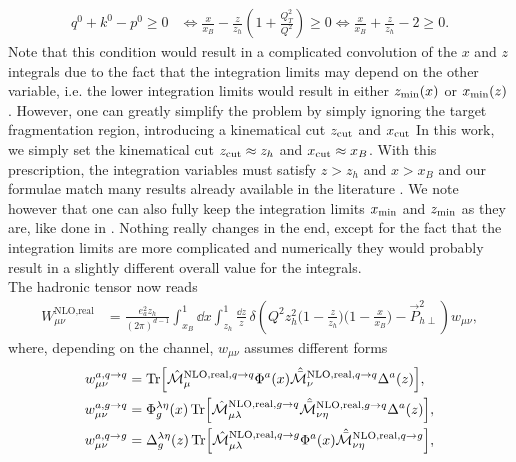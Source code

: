 \begin{equation}\label{eq:NLOrealtw2_theta function condition}
    \begin{aligned}
        q^0+k^0-p^0\ge 0 & \iff \frac{x}{x_B}-\frac{z}{z_h}\left(1+\frac{Q_T^2}{Q^2}\right)\ge 0 \iff \frac{x}{x_B}+\frac{z}{z_h}-2\ge 0.
    \end{aligned}
\end{equation}
Note that this condition would result in a complicated convolution of the $x$ and $z$ integrals due to the fact that the integration limits may depend on the other variable, i.e. the lower integration limits would result in either $z_{\rm min}(x)$ or $x_{\rm min}(z)$. However, one can greatly simplify the problem by simply ignoring the target fragmentation region, introducing a kinematical cut $z_{\rm cut}$ and $x_{\rm cut}$ \cite{Sissakian_2004} In this work, we simply set the kinematical cut $z_{\rm cut}\approx z_h$ and $x_{\rm cut}\approx x_B$. With this prescription, the integration variables must satisfy $z>z_h$ and $x>x_B$ and our formulae match many results already available in the literature \cite{de_Florian_1998,Koike_2006}. We note however that one can also fully keep the integration limits $x_{\rm min}$ and $z_{\rm min}$ as they are, like done in \cite{kanazawa_contribution_2013}. Nothing really changes in the end, except for the fact that the integration limits are more complicated and numerically they would probably result in a slightly different overall value for the integrals. \\
The hadronic tensor now reads
\begin{equation}
\begin{aligned}
      W_{\mu\nu}^{\text{NLO,real}}&=\frac{e_a^2z_h}{(2\pi)^{d-1}} \int_{x_B}^{1} \dd x\int_{z_h}^{1}  \frac{\dd z}{z}\,\delta\left(Q^2z_h^2\Big(1-\frac{z}{z_h} \Big)\Big(1-\frac{x}{x_B}\Big) - \vec P_{h\perp}^2\right)w_{\mu\nu},
\end{aligned}
\end{equation}
where, depending on the channel, $w_{\mu\nu}$ assumes different forms
\begin{equation}
    \begin{aligned}
        w_{\mu\nu}^{a,q \to q}&=\Tr[\hat{\mathcal{M}}_\mu^{\text{NLO,real},q \to q}\Phi^a(x)\hat{\bar{\mathcal{M}}}_\nu^{\text{NLO,real},q \to q}\Delta^a(z)],\\
        w_{\mu\nu}^{a,g \to q}&=\Phi_g^{\lambda\eta}(x)\Tr[\hat{\mathcal{M}}_{\mu\lambda}^{\text{NLO,real},g \to q}\hat{\bar{\mathcal{M}}}_{\nu\eta}^{\text{NLO,real},g \to q}\Delta^a(z)],\\
        w_{\mu\nu}^{a,q \to g}&=\Delta_g^{\lambda\eta}(z)\Tr[\hat{\mathcal{M}}_{\mu\lambda}^{\text{NLO,real},q \to g}\Phi^a(x)\hat{\bar{\mathcal{M}}}_{\nu\eta}^{\text{NLO,real},q \to g}],
    \end{aligned}
\end{equation}
